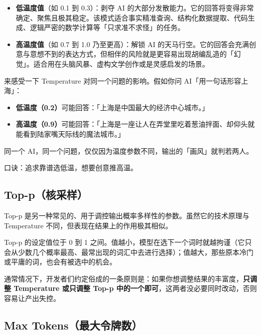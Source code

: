 \begin{itemize}
  \item \textbf{低温度值}（如 0.1 到 0.3）：剥夺 AI 的大部分发散能力。它的回答将变得非常确定、聚焦且极其稳定。该模式适合事实精准查询、结构化数据提取、代码生成、逻辑严密的数学计算等「只求准不求怪」的任务。
  \item \textbf{高温度值}（如 0.7 到 1.0 乃至更高）：解锁 AI 的天马行空。它的回答会充满创意与意想不到的表达方式，但相伴的风险就是更容易出现胡编乱造的「幻觉」。适合用在头脑风暴、虚构文学创作或是灵感启发的场景。
\end{itemize}

来感受一下 Temperature 对同一个问题的影响。假如你问 AI「用一句话形容上海」：

\begin{itemize}
  \item \textbf{低温度（0.2）}可能回答：「上海是中国最大的经济中心城市。」
  \item \textbf{高温度（0.9）}可能回答：「上海是一座让人在弄堂里吃着葱油拌面、却仰头就能看到陆家嘴天际线的魔法城市。」
\end{itemize}

同一个 AI，同一个问题，仅仅因为温度参数不同，输出的「画风」就判若两人。

\begin{tipbox}
口诀：追求靠谱选低温，想要创意推高温。
\end{tipbox}

\subsection*{Top-p（核采样）}

Top-p 是另一种常见的、用于调控输出概率多样性的参数。虽然它的技术原理与 Temperature 不同，但表现在结果上的作用极其相似。

Top-p 的设定值位于 0 到 1 之间。值越小，模型在选下一个词时就越拘谨（它只会从少数几个概率最高、最常出现的词汇中去进行选择）；值越大，那些原本冷门或平庸的词，也会有被选中的机会。

\begin{tipbox}
通常情况下，开发者们约定俗成的一条原则是：如果你想调整结果的丰富度，\textbf{只调整 Temperature 或只调整 Top-p 中的一个即可}，这两者没必要同时改动，否则容易让产出失控。
\end{tipbox}

\subsection*{Max Tokens（最大令牌数）}

